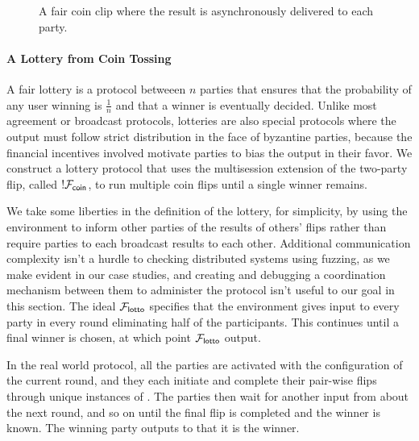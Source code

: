 \begin{figure}
\centering

\caption{A fair coin clip where the result is asynchronously delivered to each party.}
\label{fig:fcoin}
\end{figure}


\paragraph{A Lottery from Coin Tossing}
A fair lottery is a protocol betweeen $n$ parties that ensures that the
probability of any user winning is $\frac{1}{n}$ and that a winner is
eventually decided.  Unlike most agreement or broadcast protocols, lotteries
are also special protocols where the output must follow strict distribution in
the face of byzantine parties, because the financial incentives involved
motivate parties to bias the output in their favor.  We construct a lottery
protocol that uses the multisession extension of the two-party flip, called
$!\mathcal{F}_{{\mathsf {coin}}}$, to run multiple coin flips until a single winner remains. 

We take some liberties in the definition of the lottery, for simplicity, by
using the environment to inform other parties of the results of others' flips
rather than require parties to each broadcast results to each other.
Additional communication complexity isn't a hurdle to checking distributed
systems using fuzzing, as we make evident in our case studies, and creating and
debugging a coordination mechanism between them to administer the protocol
isn't useful to our goal in this section.  The ideal $\mathcal{F}_{{\mathsf {lotto}}}$ specifies
that the environment gives input to every party in every round eliminating half
of the participants.  This continues until a final winner is chosen, at which
point $\mathcal{F}_{{\mathsf {lotto}}}$ output.

In the real world protocol, all the parties are activated with the
configuration of the current round, and they each initiate and complete their
pair-wise flips through unique instances of \Fcoin.  The parties then wait for
another input from \Z about the next round, and so on until the final flip is
completed and the winner is known.  The winning party outputs to \Z that it is
the winner.

